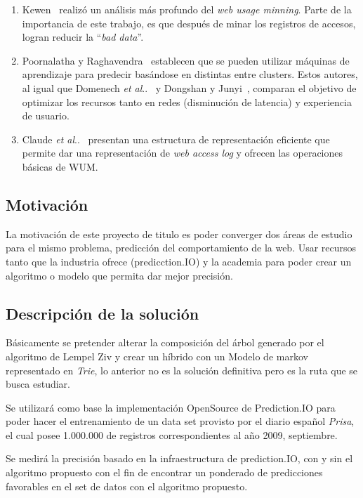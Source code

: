 \documentclass{udparticle}
\makeatletter
\DeclareRobustCommand\onedot{\futurelet\@let@token\@onedot}
\newcommand\@onedot{\ifx\@let@token.\else.\null\fi\xspace}
\newcommand\etal{\emph{et al}\onedot}
\makeatother
\begin{document}
\begin{enumerate}
  \item Kewen~\cite{kewen2012} realizó un análisis más profundo del \emph{web usage minning}.
  Parte de la importancia de este trabajo, es que después de minar los registros de accesos, logran reducir la ``\emph{bad data}''.

  \item Poornalatha y Raghavendra~\cite{Poornalatha2012} establecen que se pueden utilizar máquinas de aprendizaje para predecir basándose en distintas entre clusters. Estos autores, al igual que Domenech \etal~\cite{Domenech2006} y Dongshan y Junyi~\cite{Dongshan2002}, comparan el objetivo de optimizar los recursos tanto en redes (disminución de latencia) y experiencia de usuario.

  \item Claude \etal~\cite{Claude2014} presentan una estructura de representación eficiente que permite dar una representación de \emph{web access log} y ofrecen las operaciones básicas de WUM.
\end{enumerate}


\subsection{Motivación}

La motivación de este proyecto de titulo es poder converger dos áreas de estudio para el mismo problema, predicción del comportamiento de la web. Usar recursos tanto que la industria ofrece (predicction.IO) y la academia para poder crear un algoritmo o modelo que permita dar mejor precisión.


\subsection{Descripción de la solución }

Básicamente se pretender alterar la composición del árbol generado por el algoritmo de Lempel Ziv y crear un híbrido con un Modelo de markov representado en \emph{Trie}, lo anterior no es la solución definitiva pero es la ruta que se busca estudiar.

Se utilizará como base la implementación OpenSource de Prediction.IO para poder hacer el entrenamiento de un data set provisto por el diario español \emph{Prisa}, el cual posee 1.000.000 de registros correspondientes al año 2009, septiembre.

Se medirá la precisión basado en la infraestructura de prediction.IO, con  y sin el algoritmo propuesto con el fin de encontrar un ponderado de predicciones favorables en el set de datos con el algoritmo propuesto.
\end{document}
